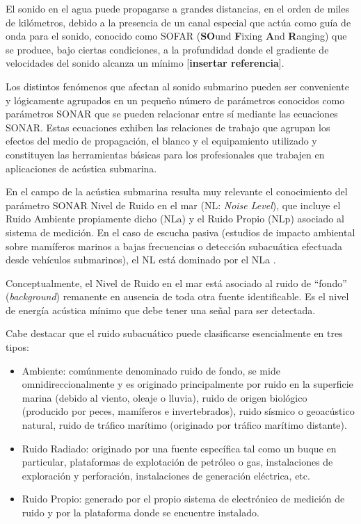 El sonido en el agua puede propagarse a grandes distancias, en el orden de miles de kilómetros, debido a la presencia de un canal especial que actúa como guía de onda para el sonido, conocido como SOFAR (\textbf{SO}und \textbf{F}ixing \textbf{A}nd \textbf{R}anging) que se produce, bajo ciertas condiciones, a la profundidad donde el gradiente de velocidades del sonido alcanza un mínimo [\textbf{insertar referencia}]. 

Los distintos fenómenos que afectan al sonido submarino pueden ser conveniente y lógicamente agrupados en un pequeño número de parámetros conocidos como parámetros SONAR que se pueden relacionar entre sí mediante las ecuaciones SONAR.  Estas ecuaciones exhiben las relaciones de trabajo que agrupan los efectos del medio de propagación, el blanco y el equipamiento utilizado y constituyen las herramientas básicas para los profesionales que trabajen en aplicaciones de acústica submarina. 

En el campo de la acústica submarina resulta muy relevante el conocimiento del parámetro SONAR Nivel de Ruido en el mar (NL: \textit{Noise Level}), que incluye el Ruido Ambiente propiamente dicho (NLa) y el Ruido Propio (NLp) asociado al sistema de medición. En el caso de escucha pasiva (estudios de impacto ambiental sobre mamíferos marinos a bajas frecuencias o detección subacuática efectuada desde vehículos submarinos), el NL está dominado por el NLa .

Conceptualmente, el Nivel de Ruido en el mar está asociado al ruido de ``fondo'' (\textit{background}) remanente en ausencia de toda otra fuente identificable. Es el nivel de energía acústica mínimo que debe tener una señal para ser detectada.

Cabe destacar que el ruido subacuático puede clasificarse esencialmente en tres tipos:

\begin{itemize}
	\item Ambiente: comúnmente denominado ruido de fondo, se mide omnidireccionalmente y es originado principalmente por ruido en la superficie marina (debido al viento, oleaje o lluvia), ruido de origen biológico (producido por peces, mamíferos e invertebrados), ruido sísmico o geoacústico natural, ruido de tráfico marítimo (originado por tráfico marítimo distante).
	\item Ruido Radiado: originado por una fuente específica tal como un buque en particular, plataformas de explotación de petróleo o gas, instalaciones de exploración y perforación, instalaciones de generación eléctrica, etc.
	\item Ruido Propio: generado por el propio sistema de electrónico de medición de ruido y por la plataforma donde se encuentre instalado.
\end{itemize} 

